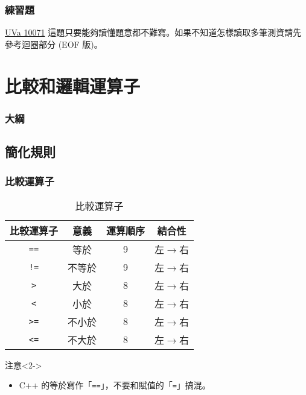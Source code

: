 \documentclass[utf8]{beamer}
\begin{document}
\begin{CJK}{UTF8}{bkai}
\begin{frame}
  \frametitle{練習題}
  \begin{exampleblock}{\href{http://unfortunate-dog.github.io/articles/100/p10071/}{UVa 10071}}
  \label{uva:10071}
  這題只要能夠讀懂題意都不難寫。如果不知道怎樣讀取多筆測資請先參考迴圈部分 (EOF 版)。
  \end{exampleblock}
\end{frame}

\section{比較和邏輯運算子}
\begin{frame}
  \frametitle{大綱}
  \begin{multicols}{2}
    \tableofcontents[currentsection]
  \end{multicols}
\end{frame}

\subsection{簡化規則}

\begin{frame}[fragile]
  \frametitle{比較運算子}
  \begin{table}[h]
    \begin{tabular}{|c|c|c|c|}
    \hline
    比較運算子       & 意義   & 運算順序 & 結合性\\
    \hline
    \lstinline{==} & 等於   & 9       & 左$\rightarrow$右\\
    \hline
    \lstinline{!=} & 不等於 & 9       & 左$\rightarrow$右\\
    \hline
    \lstinline{>}  & 大於   & 8       & 左$\rightarrow$右\\
    \hline
    \lstinline{<}  & 小於   & 8       & 左$\rightarrow$右\\
    \hline
    \lstinline{>=} & 不小於 & 8       & 左$\rightarrow$右\\
    \hline
    \lstinline{<=} & 不大於 & 8       & 左$\rightarrow$右\\
    \hline
    \end{tabular}
    \caption{比較運算子}
  \end{table}
  \begin{alertblock}{注意}<2->
    \begin{itemize}
    \item C++ 的等於寫作「\lstinline{==}」，不要和賦值的「\lstinline{=}」搞混。
    \end{itemize}
  \end{alertblock}
\end{frame}


\end{CJK}
\end{document}
